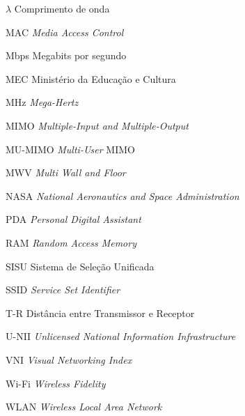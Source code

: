 \begin{siglas}
	\item[$\lambda$] \hspace{.8cm} Comprimento de onda
	\item[MAC] \hspace{.8cm} \textit{Media Access Control}
	\item[Mbps] \hspace{.8cm} Megabits por segundo
	\item[MEC] \hspace{.8cm} Ministério da Educação e Cultura
	\item[MHz] \hspace{.8cm} \textit{Mega-Hertz}
	\item[MIMO] \hspace{.8cm} \textit{Multiple-Input and Multiple-Output}
	\item[MU-MIMO] \hspace{.8cm} \textit{Multi-User} MIMO
	\item[MWV] \hspace{.8cm} \textit{Multi Wall and Floor}
	\item[NASA] \hspace{.8cm} \textit{National Aeronautics and Space Administration}
	\item[PDA] \hspace{.8cm} \textit{Personal Digital Assistant}
	\item[RAM] \hspace{.8cm} \textit{Random Access Memory}
	\item[SISU] \hspace{.8cm} Sistema de Seleção Unificada
	\item[SSID] \hspace{.8cm} \textit{Service Set Identifier}
	\item[T-R] \hspace{.8cm} Distância entre Transmissor e Receptor
	\item[U-NII] \hspace{.8cm} \textit{Unlicensed National Information Infrastructure}
	\item[VNI] \hspace{.8cm} \textit{Visual Networking Index}
	\item[Wi-Fi] \hspace{.8cm} \textit{Wireless Fidelity}
	\item[WLAN] \hspace{.8cm} \textit{Wireless Local Area Network}
\end{siglas}